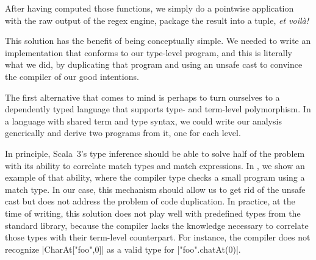 \regexTermLvlLoop
%

\noindent
After having computed those functions, we simply do a pointwise application with the raw output of the regex engine, package the result into a tuple, \emph{et voilà!}

\regexTransform

This solution has the benefit of being conceptually simple.
We needed to write an implementation that conforms to our type-level program, and this is literally what we did, by duplicating that program and using an unsafe cast to convince the compiler of our good intentions.

The first alternative that comes to mind is perhaps to turn ourselves to a dependently typed language that supports type- and term-level polymorphism.
In a language with shared term and type syntax, we could write our analysis generically and derive two programs from it, one for each level.

In principle, Scala~3's type inference should be able to solve half of the problem with its ability to correlate match types and match expressions.
In , we show an example of that ability, where the compiler type checks a small program using a match type.
In our case, this mechanism should allow us to get rid of the unsafe cast but does not address the problem of code duplication.
In practice, at the time of writing, this solution does not play well with predefined types from the standard library, because the compiler lacks the knowledge necessary to correlate those types with their term-level counterpart.
For instance, the compiler does not recognize |CharAt["foo",0]| as a valid type for |"foo".chatAt(0)|.

